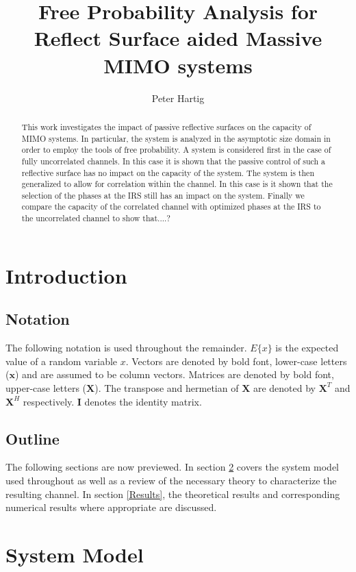 \documentclass[12pt,a4paper]{report}
\title{Free Probability Analysis for Reflect Surface aided Massive MIMO systems}
\author{Peter Hartig}
\begin{document}
\maketitle
\begin{abstract}
This work investigates the impact of passive reflective surfaces on the capacity of MIMO systems. In particular, the system is analyzed in the asymptotic size domain in order to employ the tools of free probability. A system is considered first in the case of fully uncorrelated channels. In this case it is shown that the passive control of such a reflective surface has no impact on the capacity of the system. The system is then generalized to allow for correlation within the channel. In this case is it shown that the selection of the phases at the IRS still has an impact on the system. Finally we compare the capacity of the correlated channel with optimized phases at the IRS to the uncorrelated channel to show that....?
\end{abstract}
%
\tableofcontents


\chapter{Introduction}



\section{Notation}
The following notation is used throughout the remainder. 
$E\{x\}$ is the expected value of a random variable $x$.
Vectors are denoted by bold font, lower-case letters ($\mathbf{x}$) and are assumed to be column vectors.
Matrices are denoted by bold font, upper-case letters ($\mathbf{X}$). The transpose and hermetian of $\mathbf{X}$ are denoted by $\mathbf{X}^T$ and $\mathbf{X}^H$ respectively.
$\mathbf{I}$ denotes the identity matrix.

\section{Outline}
The following sections are now previewed. In section \ref{system_model} covers the system model used throughout as well as a review of the necessary theory to characterize the resulting channel. In section \ref{Results}, the theoretical results and corresponding numerical results where appropriate are discussed. 
\chapter{System Model}\label{system_model}
\end{document}

